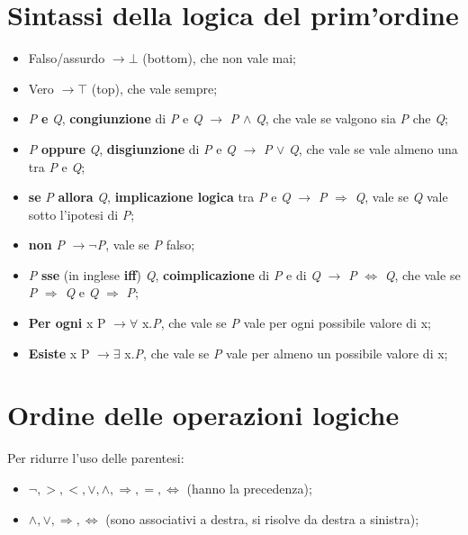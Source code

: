\documentclass[12pt]{article}
\begin{document}
\section{Sintassi della logica del prim'ordine}
\begin{itemize}
    \item Falso/assurdo $\rightarrow \bot$ (bottom), che non vale mai;
    \item Vero $\rightarrow \top$ (top), che vale sempre;
    \item \textit{P} \textbf{e} \textit{Q}, \textbf{congiunzione} di \textit{P} e \textit{Q} $\rightarrow$ \textit{P} $\land$ \textit{Q}, che vale se valgono sia \textit{P} che \textit{Q};
    \item \textit{P} \textbf{oppure} \textit{Q}, \textbf{disgiunzione} di \textit{P} e \textit{Q} $\rightarrow$ \textit{P} $\lor$ \textit{Q}, che vale se vale almeno una tra \textit{P} e \textit{Q};
    \item \textbf{se} \textit{P} \textbf{allora} \textit{Q}, \textbf{implicazione logica} tra \textit{P} e \textit{Q} $\rightarrow$ \textit{P} $\Rightarrow$ \textit{Q}, vale se \textit{Q} vale sotto l'ipotesi di \textit{P};
    \item \textbf{non} \textit{P} $\rightarrow \neg$\textit{P}, vale se \textit{P} falso;
    \item \textit{P} \textbf{sse} (in inglese \textbf{iff}) \textit{Q}, \textbf{coimplicazione} di \textit{P} e di \textit{Q} $\rightarrow$ \textit{P} $\Leftrightarrow$ \textit{Q}, che vale se \textit{P} $\Rightarrow$ \textit{Q} e \textit{Q} $\Rightarrow$ \textit{P};
    \item \textbf{Per ogni} x P $\rightarrow \forall$ x.\textit{P}, che vale se \textit{P} vale per ogni possibile valore di x;
    \item \textbf{Esiste} x P $\rightarrow \exists$ x.\textit{P}, che vale se \textit{P} vale per almeno un possibile valore di x;  
\end{itemize}
\section{Ordine delle operazioni logiche}
Per ridurre l'uso delle parentesi:
\begin{itemize}
    \item $\neg, >, <, \lor, \land, \Rightarrow, =, \Leftrightarrow$ (hanno la precedenza);
    \item $\land, \lor, \Rightarrow, \Leftrightarrow$ (sono associativi a destra, si risolve da destra a sinistra); 
\end{itemize}
\pagebreak
\end{document}
